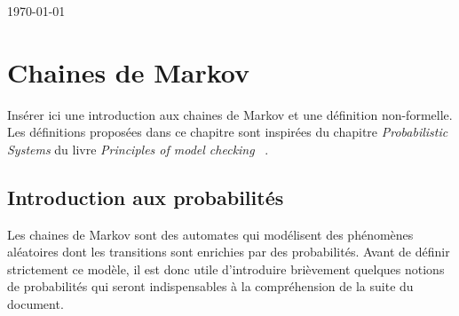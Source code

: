 \documentclass[12pt,a4paper]{report}
\theoremstyle{definition}
\theoremstyle{remark}
\begin{document}
\begin{titlepage}
	
	\vspace{7cm}
	{\large \today}\\[3cm] %
	
	
	
	
	\vfill %
	
\end{titlepage}

\newpage
\tableofcontents
\listoftheorems[ignoreall,show={definition,example}]
\newpage

\chapter{Chaines de Markov}

Insérer ici une introduction aux chaines de Markov et une définition non-formelle.\\

Les définitions proposées dans ce chapitre sont inspirées du chapitre \textit{Probabilistic Systems} du livre \textit{Principles of model checking} ~\cite{DBLP:books/daglib/0020348}.

\section{Introduction aux probabilités}
Les chaines de Markov sont des automates qui modélisent des phénomènes aléatoires dont les transitions sont enrichies par des probabilités. Avant de définir strictement ce modèle, il est donc utile d'introduire brièvement quelques notions de probabilités qui seront indispensables à la compréhension de la suite du document.
\end{document}
